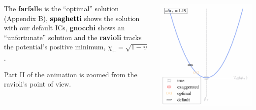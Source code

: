 \begin{frame}[plain]%
    \begin{columns}   
    \begin{column}{0.5\textwidth}\small
        The \textcolor{O2}{\textbf{farfalle}} is the ``optimal'' solution (Appendix B), \textcolor{black}{\textbf{spaghetti}} shows the solution with our default ICs, \textcolor{uiopink2}{\textbf{gnocchi}} shows an ``unfortunate'' solution and the \textcolor{uiogrey}{\textbf{ravioli}} tracks the potential's positive minimum, $\chi_+=\sqrt{1-\upsilon}$. 
        \smallskip

        {Part II of the animation is zoomed from the \textcolor{uiogrey}{ravioli}'s point of view.}

    \end{column}
    \begin{column}{0.5\textwidth}\small
        \centering
        \vspace*{-3mm}
        \ifCompAnims 
        \else 
        \includegraphics[keepaspectratio,width=\columnwidth,height=0.98\textheight]{gifs/asym_ball/asym_ball-199}
        \fi
    \end{column}
    \end{columns}
    
\begin{notes}[1][animation]
\end{notes}
\end{frame}


